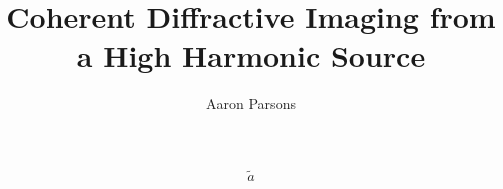 \documentclass[12pt,a4paper,twoside]{report}
\author{Aaron Parsons}
\title{Coherent Diffractive Imaging from a High Harmonic Source}
\begin{document}
%
%
%
%
%
%
%


\begin{equation}
\tilde{a}
\end{equation}
\end{document}
